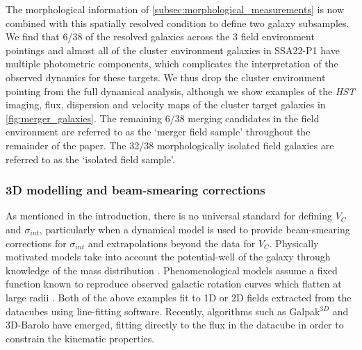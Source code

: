 \documentclass[fleqn,usenatbib]{mn2e}
\begin{document}
The morphological information of \cref{subsec:morphological_measurements} is now combined with this spatially resolved condition to define two galaxy subsamples.
We find that 6/38 of the resolved galaxies across the 3 field environment pointings and almost all of the cluster environment galaxies in SSA22-P1 have multiple photometric components, which complicates the interpretation of the observed dynamics for these targets.
We thus drop the cluster environment pointing from the full dynamical analysis, although we show examples of the {\em HST} imaging, flux, dispersion and velocity maps of the cluster target galaxies in \cref{fig:merger_galaxies}.
The remaining 6/38 merging candidates in the field environment are referred to as the `merger field sample' throughout the remainder of the paper.
The 32/38 morphologically isolated field galaxies are referred to as the `isolated field sample'.

\subsubsection{3D modelling and beam-smearing corrections}\label{subsec:3d_modelling}

As mentioned in the introduction, there is no universal standard for defining $V_{C}$ and $\sigma_{int}$, particularly when a dynamical model is used to provide beam-smearing corrections for $\sigma_{int}$ and extrapolations beyond the data for $V_{C}$.
Physically motivated models take into account the potential-well of the galaxy through knowledge of the mass distribution \citep[e.g.][]{Genzel2008,ForsterSchreiber2009,Gnerucci2011,Wisnioski2015,Swinbank2017}.
Phenomenological models assume a fixed function known to reproduce observed galactic rotation curves which flatten at large radii \citep[e.g.][]{Epinat2010,Epinat2012,Swinbank2012,Stott2016,Harrison2017}.
Both of the above examples fit to 1D or 2D fields extracted from the datacubes using line-fitting software.
Recently, algorithms such as Galpak$^{3D}$ \citep{Bouche2015} and 3D-Barolo \citep{DiTeodoro2015} have emerged, fitting directly to the flux in the datacube in order to constrain the kinematic properties.
\end{document}
